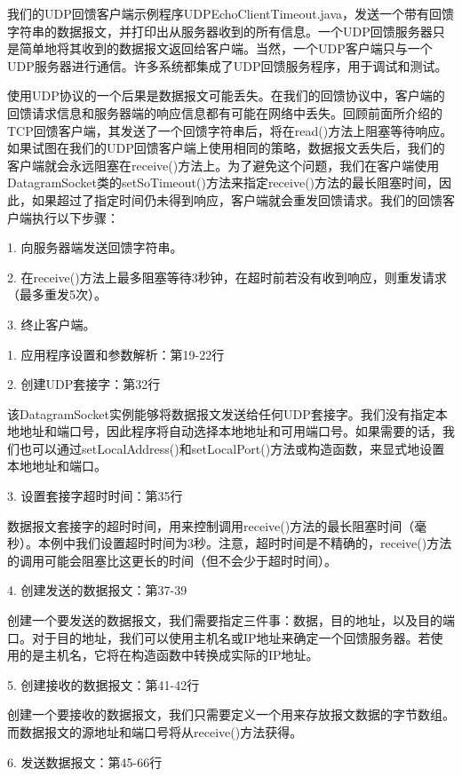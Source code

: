 		我们的UDP回馈客户端示例程序UDPEchoClientTimeout.java，发送一个带有回馈字符串的数据报文，并打印出从服务器收到的所有信息。一个UDP回馈服务器只是简单地将其收到的数据报文返回给客户端。当然，一个UDP客户端只与一个UDP服务器进行通信。许多系统都集成了UDP回馈服务程序，用于调试和测试。 

		使用UDP协议的一个后果是数据报文可能丢失。在我们的回馈协议中，客户端的回馈请求信息和服务器端的响应信息都有可能在网络中丢失。回顾前面所介绍的TCP回馈客户端，其发送了一个回馈字符串后，将在read()方法上阻塞等待响应。如果试图在我们的UDP回馈客户端上使用相同的策略，数据报文丢失后，我们的客户端就会永远阻塞在receive()方法上。为了避免这个问题，我们在客户端使用DatagramSocket类的setSoTimeout()方法来指定receive()方法的最长阻塞时间，因此，如果超过了指定时间仍未得到响应，客户端就会重发回馈请求。我们的回馈客户端执行以下步骤： 

		1. 向服务器端发送回馈字符串。 

		2. 在receive()方法上最多阻塞等待3秒钟，在超时前若没有收到响应，则重发请求（最多重发5次）。 

		3. 终止客户端。 

		

		1. 应用程序设置和参数解析：第19-22行 

		2. 创建UDP套接字：第32行 

		该DatagramSocket实例能够将数据报文发送给任何UDP套接字。我们没有指定本地地址和端口号，因此程序将自动选择本地地址和可用端口号。如果需要的话，我们也可以通过setLocalAddress()和setLocalPort()方法或构造函数，来显式地设置本地地址和端口。 

		3. 设置套接字超时时间：第35行 

		数据报文套接字的超时时间，用来控制调用receive()方法的最长阻塞时间（毫秒）。本例中我们设置超时时间为3秒。注意，超时时间是不精确的，receive()方法的调用可能会阻塞比这更长的时间（但不会少于超时时间）。 

		4. 创建发送的数据报文：第37-39

		创建一个要发送的数据报文，我们需要指定三件事：数据，目的地址，以及目的端口。对于目的地址，我们可以使用主机名或IP地址来确定一个回馈服务器。若使用的是主机名，它将在构造函数中转换成实际的IP地址。 

		5. 创建接收的数据报文：第41-42行 

		创建一个要接收的数据报文，我们只需要定义一个用来存放报文数据的字节数组。而数据报文的源地址和端口号将从receive()方法获得。 

		6. 发送数据报文：第45-66行 

